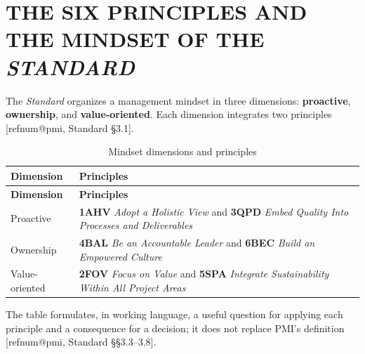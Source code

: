 \documentclass[12pt,a4paper,article,oneside,brazil,english]{abntex2}
\makeatletter
\newcommand{\fontetab}[1]{\par\vspace{3pt}{\small\noindent Source: #1\par}}
\newcommand{\refnum}[1]{\csname refnum@#1\endcsname}
\newcommand{\cit}[1]{[\refnum{#1}]}
\makeatother
\begin{document}
\section{THE SIX PRINCIPLES AND THE MINDSET OF THE \textit{STANDARD}}

The \textit{Standard} organizes a management mindset in three dimensions: \textbf{proactive}, \textbf{ownership}, and \textbf{value-oriented}. Each dimension integrates two principles [\refnum{pmi}, Standard §3.1].

\begingroup\SingleSpacing\small
\begin{longtable}{@{}>{\raggedright\arraybackslash}p{}>{\raggedright\arraybackslash}p{}@{}}
\caption{Mindset dimensions and principles}\label{tab:t2}\\
\hline
\textbf{Dimension} & \textbf{Principles}\\
\hline
\endfirsthead
\hline
\textbf{Dimension} & \textbf{Principles}\\
\hline
\endhead
\hline
\endfoot
\hline
\endlastfoot
Proactive & \textbf{1AHV} \textit{Adopt a Holistic View} and \textbf{3QPD} \textit{Embed Quality Into Processes and Deliverables}\\[3pt]
Ownership & \textbf{4BAL} \textit{Be an Accountable Leader} and \textbf{6BEC} \textit{Build an Empowered Culture}\\[3pt]
Value-oriented & \textbf{2FOV} \textit{Focus on Value} and \textbf{5SPA} \textit{Integrate Sustainability Within All Project Areas}\\[3pt]
\end{longtable}
\endgroup
\fontetab{Prepared by the authors (2026), based on \cit{pmi}.}

The table formulates, in working language, a useful question for applying each principle and a consequence for a decision; it does not replace PMI's definition [\refnum{pmi}, Standard §§3.3–3.8].
\end{document}
